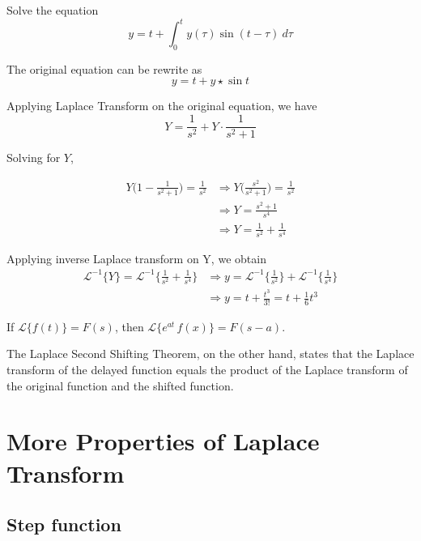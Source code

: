 \begin{example}
    Solve the equation 
    \[
        y = t + \int_{0}^{t} y(\tau) \sin(t - \tau) \> d\tau
    \]
\end{example}
\begin{solution}
    The original equation can be rewrite as 
    \[
        y = t + y \star \sin t
    \]

    Applying Laplace Transform on the original equation, we have 
    \[
        Y = \frac{1}{s^2} + Y \cdot \frac{1}{s^2 + 1}
    \]

    Solving for $Y$, 

    \begin{align*}
        Y \biggl(1 - \frac{1}{s^2 + 1}\biggr) = \frac{1}{s^2} &\Rightarrow 
        Y \biggl(\frac{s^2}{s^2 + 1}\biggr) = \frac{1}{s^2}\\
        &\Rightarrow Y = \frac{s^2 + 1}{s^4}\\
        &\Rightarrow Y = \frac{1}{s^2} + \frac{1}{s^4}
    \end{align*}

    Applying inverse Laplace transform on Y, we obtain
    \begin{align*}
        \mathcal{L}^{-1}\{Y\} = \mathcal{L}^{-1} \biggl\{\frac{1}{s^2} + \frac{1}{s^4}\biggr\} &\Rightarrow 
        y = \mathcal{L}^{-1}\biggl\{\frac{1}{s^2}\biggr\} + \mathcal{L}^{-1}\biggl\{\frac{1}{s^4}\biggr\}\\
        &\Rightarrow y = t + \frac{t^3}{3!} = t + \frac{1}{6}t^3
    \end{align*}
\end{solution}

\begin{theorem}
    If $\mathcal{L}\{f(t) \} = F(s)$, then $\mathcal{L}\{e^{at} \, f(x)\} = F(s-a)$.
\end{theorem}

The Laplace Second Shifting Theorem, on the other hand, states that the
 Laplace transform of the delayed function
 equals the product of the Laplace transform of the original function and the shifted function.

\section{More Properties of Laplace Transform}

\subsection{Step function}

